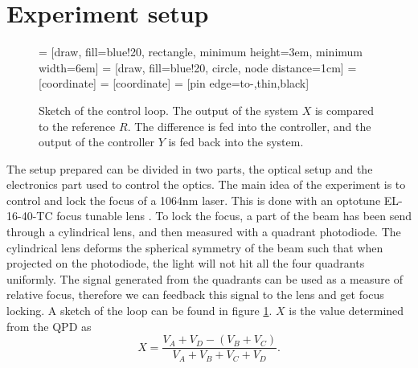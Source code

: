 \documentclass[a4paper,10pt]{article}
\begin{document}
\section{Experiment setup}
\begin{figure}[htp!]
    \centering
     = [draw, fill=blue!20, rectangle,
    minimum height=3em, minimum width=6em]
     = [draw, fill=blue!20, circle, node distance=1cm]
     = [coordinate]
     = [coordinate]
     = [pin edge={to-,thin,black}]

\caption{Sketch of the control loop. The output of the system $X$ is compared to the reference $R$. The difference is fed into the controller, and the output of the controller $Y$ is fed back into the system. }
\label{fig:control_loop}
\end{figure}
The setup prepared can be divided in two parts, the optical setup and the electronics part used to control the optics. The main idea of the experiment is to control and lock the focus of a 1064nm laser. This is done with an optotune EL-16-40-TC focus tunable lens \cite{lens_datasheet}. To lock the focus, a part of the beam has been send through a cylindrical lens, and then measured with a quadrant photodiode. The cylindrical lens deforms the spherical symmetry of the beam such that when projected on the photodiode, the light will not hit all the four quadrants uniformly. The signal generated from the quadrants can be used as a measure of relative focus, therefore we can feedback this signal to the lens and get focus locking. A sketch of the loop can be found in figure \ref{fig:control_loop}. $X$ is the value determined from the QPD as
\begin{equation}\label{eq:voltage}
X = \frac{V_A + V_D - (V_B+V_C)}{V_A+V_B+V_C+V_D}.
\end{equation}
\end{document}
